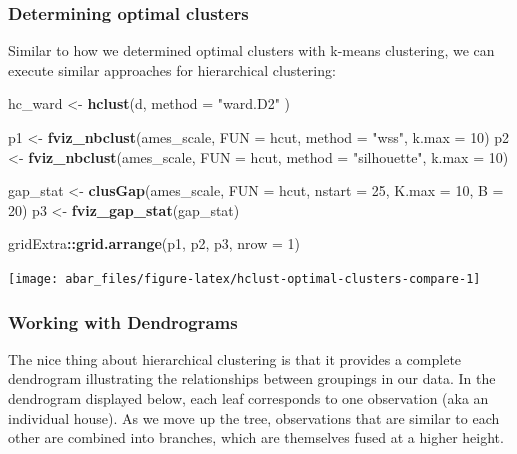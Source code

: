 \documentclass[]{book}
\newenvironment{Shaded}{\begin{snugshade}}{\end{snugshade}}
\newcommand{\DataTypeTok}[1]{\textcolor[rgb]{0.13,0.29,0.53}{#1}}
\newcommand{\DecValTok}[1]{\textcolor[rgb]{0.00,0.00,0.81}{#1}}
\newcommand{\KeywordTok}[1]{\textcolor[rgb]{0.13,0.29,0.53}{\textbf{#1}}}
\newcommand{\NormalTok}[1]{#1}
\newcommand{\OperatorTok}[1]{\textcolor[rgb]{0.81,0.36,0.00}{\textbf{#1}}}
\newcommand{\StringTok}[1]{\textcolor[rgb]{0.31,0.60,0.02}{#1}}
\theoremstyle{definition}
\theoremstyle{definition}
\theoremstyle{definition}
\theoremstyle{remark}
\begin{document}
\hypertarget{determining-optimal-clusters-1}{%
\subsubsection{Determining optimal
clusters}\label{determining-optimal-clusters-1}}

Similar to how we determined optimal clusters with k-means clustering,
we can execute similar approaches for hierarchical clustering:

\begin{Shaded}
\begin{Highlighting}[]
\NormalTok{hc_ward <-}\StringTok{ }\KeywordTok{hclust}\NormalTok{(d, }\DataTypeTok{method =} \StringTok{"ward.D2"}\NormalTok{ )}

\NormalTok{p1 <-}\StringTok{ }\KeywordTok{fviz_nbclust}\NormalTok{(ames_scale, }\DataTypeTok{FUN =}\NormalTok{ hcut, }\DataTypeTok{method =} \StringTok{"wss"}\NormalTok{, }\DataTypeTok{k.max =} \DecValTok{10}\NormalTok{)}
\NormalTok{p2 <-}\StringTok{ }\KeywordTok{fviz_nbclust}\NormalTok{(ames_scale, }\DataTypeTok{FUN =}\NormalTok{ hcut, }\DataTypeTok{method =} \StringTok{"silhouette"}\NormalTok{, }\DataTypeTok{k.max =} \DecValTok{10}\NormalTok{)}

\NormalTok{gap_stat <-}\StringTok{ }\KeywordTok{clusGap}\NormalTok{(ames_scale, }\DataTypeTok{FUN =}\NormalTok{ hcut, }\DataTypeTok{nstart =} \DecValTok{25}\NormalTok{, }\DataTypeTok{K.max =} \DecValTok{10}\NormalTok{, }\DataTypeTok{B =} \DecValTok{20}\NormalTok{)}
\NormalTok{p3 <-}\StringTok{ }\KeywordTok{fviz_gap_stat}\NormalTok{(gap_stat)}

\NormalTok{gridExtra}\OperatorTok{::}\KeywordTok{grid.arrange}\NormalTok{(p1, p2, p3, }\DataTypeTok{nrow =} \DecValTok{1}\NormalTok{)}
\end{Highlighting}
\end{Shaded}

\begin{center}\texttt{[image: abar\_files/figure-latex/hclust-optimal-clusters-compare-1]} \end{center}

\hypertarget{working-with-dendrograms}{%
\subsubsection{Working with
Dendrograms}\label{working-with-dendrograms}}

The nice thing about hierarchical clustering is that it provides a
complete dendrogram illustrating the relationships between groupings in
our data. In the dendrogram displayed below, each leaf corresponds to
one observation (aka an individual house). As we move up the tree,
observations that are similar to each other are combined into branches,
which are themselves fused at a higher height.
\end{document}

